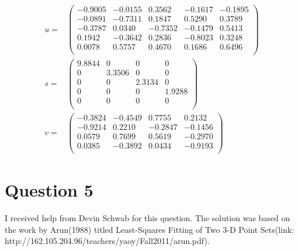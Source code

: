 \documentclass{article}
\begin{document}
\begin{equation*}
\begin{aligned}
u = &
\begin{pmatrix}
   -0.9005  & -0.0155  &  0.3562 &  -0.1617 &  -0.1895 \\
   -0.0891  & -0.7311  &  0.1847  &  0.5290 &   0.3789 \\
   -0.3787  &  0.0340  & -0.7352 &  -0.1479  &  0.5413 \\
    0.1942  & -0.3642  &  0.2836 &  -0.8023  &  0.3248 \\
    0.0078  &  0.5757  &  0.4670  &  0.1686  & 0.6496 \\
\end{pmatrix}
\\
s =&
\begin{pmatrix}
    9.8844    &     0   &      0     &    0\\
         0 &  3.3506   &      0     &    0\\
         0    &     0  &  2.3134    &     0\\
         0    &     0    &     0   & 1.9288\\
         0    &     0     &    0    &     0\\
\end{pmatrix}
\\
v =&
\begin{pmatrix}
   -0.3824  & -0.4549  &  0.7755  &  0.2132 \\
   -0.9214  &  0.2210  & -0.2847  & -0.1456 \\
    0.0579  &  0.7699  &  0.5619  & -0.2970 \\
    0.0385  & -0.3892  &  0.0434  & -0.9193 \\
 \end{pmatrix}
 \end{aligned}
 \end{equation*}



\section{Question 5}
I received help from Devin Schwab for this question. The solution was based on the work by Arun(1988) titled Least-Squares Fitting of Two 3-D Point Sets(link: http://162.105.204.96/teachers/yaoy/Fall2011/arun.pdf).\\
\end{document}
